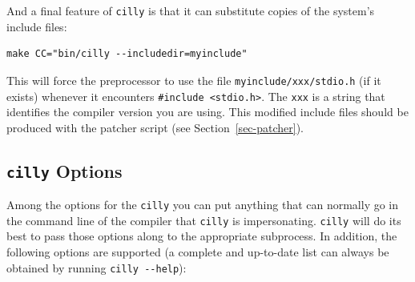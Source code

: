 \documentclass[letterpaper]{article}
\def\secref#1{Section~\ref{sec-#1}}
\def\t#1{{\tt #1}}
\begin{document}
 And a final feature of \t{cilly} is that it can substitute copies of the
system's include files:

\begin{verbatim}
make CC="bin/cilly --includedir=myinclude"
\end{verbatim}

 This will force the preprocessor to use the file \t{myinclude/xxx/stdio.h}
(if it exists) whenever it encounters \t{\#include <stdio.h>}. The \t{xxx} is
a string that identifies the compiler version you are using. This modified
include files should be produced with the patcher script (see
\secref{patcher}).

  \subsection{\t{cilly} Options}

 Among the options for the \t{cilly} you can put anything that can normally
go in the command line of the compiler that \t{cilly} is impersonating.
\t{cilly} will do its best to pass those options along to the appropriate
subprocess. In addition, the following options are supported (a complete and
up-to-date list can always be obtained by running \t{cilly -{}-help}):
\end{document}

